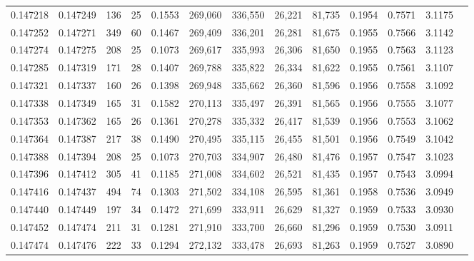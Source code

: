 \begin{tabular}{rrrrrrrrrrrrr}
0.147218 & 0.147249 &   136 &  25 &                                     0.1553 & 269,060 & 336,550 &  26,221 &  81,735 & 0.1954 & 0.7571 & 3.1175 \\
0.147252 & 0.147271 &   349 &  60 &                                     0.1467 & 269,409 & 336,201 &  26,281 &  81,675 & 0.1955 & 0.7566 & 3.1142 \\
0.147274 & 0.147275 &   208 &  25 &                                     0.1073 & 269,617 & 335,993 &  26,306 &  81,650 & 0.1955 & 0.7563 & 3.1123 \\
0.147285 & 0.147319 &   171 &  28 &                                     0.1407 & 269,788 & 335,822 &  26,334 &  81,622 & 0.1955 & 0.7561 & 3.1107 \\
0.147321 & 0.147337 &   160 &  26 &                                     0.1398 & 269,948 & 335,662 &  26,360 &  81,596 & 0.1956 & 0.7558 & 3.1092 \\
0.147338 & 0.147349 &   165 &  31 &                                     0.1582 & 270,113 & 335,497 &  26,391 &  81,565 & 0.1956 & 0.7555 & 3.1077 \\
0.147353 & 0.147362 &   165 &  26 &                                     0.1361 & 270,278 & 335,332 &  26,417 &  81,539 & 0.1956 & 0.7553 & 3.1062 \\
0.147364 & 0.147387 &   217 &  38 &                                     0.1490 & 270,495 & 335,115 &  26,455 &  81,501 & 0.1956 & 0.7549 & 3.1042 \\
0.147388 & 0.147394 &   208 &  25 &                                     0.1073 & 270,703 & 334,907 &  26,480 &  81,476 & 0.1957 & 0.7547 & 3.1023 \\
0.147396 & 0.147412 &   305 &  41 &                                     0.1185 & 271,008 & 334,602 &  26,521 &  81,435 & 0.1957 & 0.7543 & 3.0994 \\
0.147416 & 0.147437 &   494 &  74 &                                     0.1303 & 271,502 & 334,108 &  26,595 &  81,361 & 0.1958 & 0.7536 & 3.0949 \\
0.147440 & 0.147449 &   197 &  34 &                                     0.1472 & 271,699 & 333,911 &  26,629 &  81,327 & 0.1959 & 0.7533 & 3.0930 \\
0.147452 & 0.147474 &   211 &  31 &                                     0.1281 & 271,910 & 333,700 &  26,660 &  81,296 & 0.1959 & 0.7530 & 3.0911 \\
0.147474 & 0.147476 &   222 &  33 &                                     0.1294 & 272,132 & 333,478 &  26,693 &  81,263 & 0.1959 & 0.7527 & 3.0890 \\

\end{tabular}
